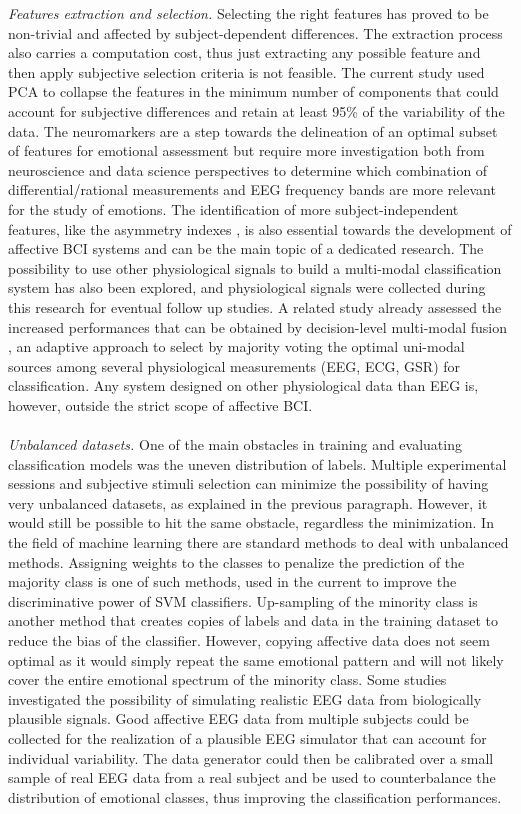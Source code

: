 \emph{Features extraction and selection.} Selecting the right features has proved to be non-trivial and affected by subject-dependent differences. The extraction process also carries a computation cost, thus just extracting any possible feature and then apply subjective selection criteria is not feasible. The current study used \ac{PCA} to collapse the features in the minimum number of components that could account for subjective differences and retain at least 95\% of the variability of the data. The neuromarkers are a step towards the delineation of an optimal subset of features for emotional assessment but require more investigation both from neuroscience and data science perspectives to determine which combination of differential/rational measurements and EEG frequency bands are more relevant for the study of emotions. The identification of more subject-independent features, like the asymmetry indexes \cite{lin_toward_2015}, is also essential towards the development of affective \ac{BCI} systems and can be the main topic of a dedicated research. The possibility to use other physiological signals to build a multi-modal classification system has also been explored, and physiological signals were collected during this research for eventual follow up studies. A related study already assessed the increased performances that can be obtained by decision-level multi-modal fusion \cite{thammasan_multimodal_2017}, an adaptive approach to select by majority voting the optimal uni-modal sources among several physiological measurements (\ac{EEG}, \ac{ECG}, \ac{GSR}) for classification. Any system designed on other physiological data than \ac{EEG} is, however, outside the strict scope of affective \ac{BCI}.
\\
\\
\emph{Unbalanced datasets.} One of the main obstacles in training and evaluating classification models was the uneven distribution of labels. Multiple experimental sessions and subjective stimuli selection can minimize the possibility of having very unbalanced datasets, as explained in the previous paragraph. However, it would still be possible to hit the same obstacle, regardless the minimization. In the field of machine learning there are standard methods to deal with unbalanced methods. Assigning weights to the classes to penalize the prediction of the majority class is one of such methods, used in the current to improve the discriminative power of \ac{SVM} classifiers. Up-sampling of the minority class is another method that creates copies of labels and data in the training dataset to reduce the bias of the classifier. However, copying affective data does not seem optimal as it would simply repeat the same emotional pattern and will not likely cover the entire emotional spectrum of the minority class. Some studies investigated the possibility of simulating realistic \ac{EEG} data \cite{barzegaran_eegsourcesim_2019} from biologically plausible signals. Good affective \ac{EEG} data from multiple subjects could be collected for the realization of a plausible \ac{EEG}  simulator that can account for individual variability. The data generator could then be calibrated over a small sample of real \ac{EEG}  data from a real subject and be used to counterbalance the distribution of emotional classes, thus improving the classification performances.
